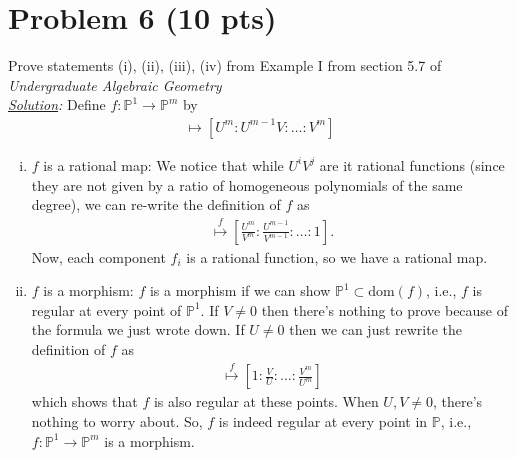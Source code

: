 \documentclass[12pt]{article}
\newcommand{\f}[2]{\frac{#1}{#2}}
\begin{document}
\newpage


\section*{Problem 6 \small{(10 pts)}}
Prove statements (i), (ii), (iii), (iv) from Example I from section 5.7 of \textit{Undergraduate Algebraic Geometry}\\

\noindent \textit{\underline{Solution}:} Define $f : \mathbb{P}^1 \to \mathbb{P}^m$ by 
\begin{align*}
[U:V] \mapsto [U^m : U^{m-1}V : \dots : V^m]
\end{align*}
\begin{enumerate}[(i)]
	\item $f$ is a rational map: We notice that while $U^i V^j$ are it rational functions (since they are not given by a ratio of homogeneous polynomials of the same degree), we can re-write the definition of $f$ as
	\begin{align*}
	[U:V] \stackrel{f}{\mapsto} \left[ \f{U^m}{V^m} : \f{U^{m-1}}{V^{m-1}}: \dots : 1 \right].
	\end{align*}
	Now, each component $f_i$ is a rational function, so we have a rational map.
	
	
	\item $f$ is a morphism: $f$ is a morphism if we can show $\mathbb{P}^1 \subset \mbox{dom}(f)$, i.e., $f$ is regular at every point of $\mathbb{P}^1$. If $V\neq 0$ then there's nothing to prove because of the formula we just wrote down. If $U\neq 0$ then we can just rewrite the definition of $f$ as
	\begin{align*}
	[U:V] \stackrel{f}{\mapsto} \left[1 : \f{V}{U} : \dots  : \f{V^m}{U^m}\right]
	\end{align*} 
	which shows that $f$ is also regular at these points. When $U,V\neq 0$, there's nothing to worry about. So, $f$ is indeed regular at every point in $\mathbb{P}$, i.e., $f : \mathbb{P}^1 \to \mathbb{P}^m$ is a morphism.
	

\end{enumerate}
\end{document}
